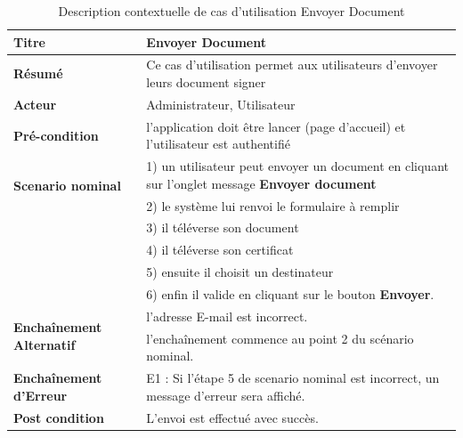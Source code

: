 \documentclass[12pt,a4paper]{article}
\begin{document}
				\begin{table}[H]
				\centering
					\caption{Description contextuelle de cas d'utilisation Envoyer Document}
				\begin{tabular}{|l|p{11cm}|}
					\hline 
						\textbf{Titre} & Envoyer Document \\ 
					\hline 
						\textbf{Résumé} & Ce cas d'utilisation permet aux utilisateurs d'envoyer leurs document signer \\ 
					\hline 
						\textbf{Acteur} & Administrateur, Utilisateur \\ 
			
					\hline 
						\textbf{Pré-condition} & l'application doit être lancer (page d'accueil) et l'utilisateur est authentifié  \\ 
					\hline 
						\multirow{2}{*}{\textbf{Scenario nominal}} & 1) un utilisateur peut envoyer un document en cliquant sur l'onglet message \textbf{Envoyer document} \\
							 & 2) le système lui renvoi le formulaire à remplir \\
							 & 3) il téléverse son document \\
							 & 4) il téléverse son certificat\\
							 & 5) ensuite il choisit un destinateur\\
							 & 6) enfin il valide en cliquant sur le bouton \textbf{Envoyer}.\\
					\hline 
					
						\multirow{2}{*}{\textbf{Enchaînement Alternatif}} & l'adresse E-mail est incorrect. \\
							  & l'enchaînement commence au point 2 du scénario nominal. \\
							
					\hline 
						\textbf{Enchaînement d'Erreur} & E1 : Si l'étape 5 de scenario nominal est incorrect, un message d'erreur sera affiché. \\
					\hline
						\textbf{Post condition} & L'envoi est effectué avec succès.\\
					\hline
			\end{tabular} 
		\end{table} 
	
		
	
	
	
	
	
	
	
	 
	
	
	
	
	
	

\end{document}
